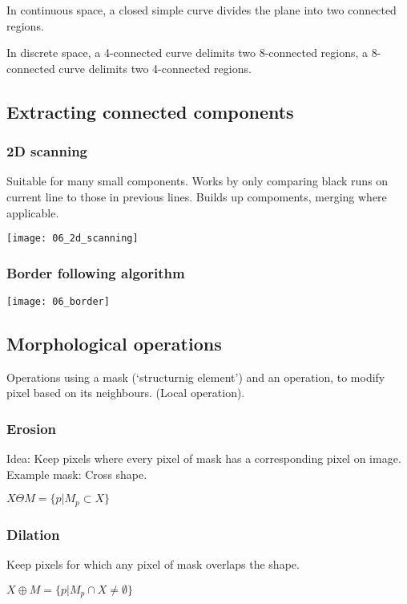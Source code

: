In continuous space, a closed simple curve divides the plane into two connected
regions.

In discrete space, a 4-connected curve delimits two 8-connected regions, a
8-connected curve delimits two 4-connected regions.

\subsection{Extracting connected components}

\subsubsection{2D scanning}

Suitable for many small components. Works by only comparing black runs on
current line to those in previous lines. Builds up compoments, merging where
applicable.

\texttt{[image: 06\_2d\_scanning]}

\subsubsection{Border following algorithm}

\texttt{[image: 06\_border]}

\subsection{Morphological operations}

Operations using a mask (`structurnig element') and an operation, to modify
pixel based on its neighbours. (Local operation).

\subsubsection{Erosion}

Idea: Keep pixels where every pixel of mask has a corresponding pixel on image.
Example mask: Cross shape.

$X \Theta M = \{p | M_p \subset X\}$

\subsubsection{Dilation}

Keep pixels for which any pixel of mask overlaps the shape.

$X \oplus M = \{p | M_p \cap X \neq \emptyset\}$

